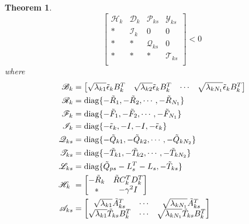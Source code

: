 \documentclass[conference]{IEEEtran}
\newtheorem{theorem}{Theorem}
\begin{document}
\begin{theorem}
	\begin{equation}\label{T3C3}
		\begin{bmatrix}
			\mathscr{H}_{k}&\mathscr{D}_{k}&\mathscr{P}_{ks}&\mathscr{Y}_{ks}\\
			*&\mathscr{I}_{k}&0&0\\
			*&*&\mathscr{Q}_{ks}&0\\
			*&*&*&\mathscr{T}_{ks}\\
		\end{bmatrix} <0
	\end{equation}
	where 
	\begin{equation}\notag
		\begin{split}
			\mathscr{B}_{k}&= \begin{bmatrix}
				\sqrt{\lambda_{k1}}\tilde{\epsilon}_{k}B^{T}_{k}&\sqrt{\lambda_{k2}}\tilde{\epsilon}_{k}B^{T}_{k}&\cdots&\sqrt{\lambda_{kN_{1}}}\tilde{\epsilon}_{k}B^{T}_{k}
			\end{bmatrix}\\
			\mathscr{R}_{k}&= \mathrm{diag}\{-\tilde{R}_{1}, -\tilde{R}_{2}, \cdots, -\tilde{R}_{N_{1}} \} \\
			\mathscr{F}_{k}&= \mathrm{diag}\{-\tilde{F}_{1}, -\tilde{F}_{2}, \cdots, -\tilde{F}_{N_{1}} \} \\	
			\mathscr{I}_{k} &= \mathrm{diag}\{-\tilde{\epsilon}_{k}, -I, -I, -\tilde{\epsilon}_{k} \}\\	
			\mathscr{Q}_{ks}&= \mathrm{diag}\{-\tilde{Q}_{k1}, -\tilde{Q}_{k2}, \cdots, -\tilde{Q}_{kN_{2}} \}\\
			\mathscr{T}_{ks}&= \mathrm{diag}\{-\tilde{T}_{k1}, -\tilde{T}_{k2}, \cdots, -\tilde{T}_{kN_{2}} \}\\
			\mathscr{L}_{ks}&= \mathrm{diag}\{\tilde{Q}_{ps}-L^{T}_{s}-L_{s},  -\tilde{T}_{ks} \}\\
			\mathscr{H}_{k}\ &= \begin{bmatrix}
				-\tilde{R}_{k} & \tilde{R}C^{T}_{k}D^{T}_{k}\\
				*& -\gamma^{2}I
			\end{bmatrix} \\
			\mathscr{A}_{ks} &=\begin{bmatrix}
				\sqrt{\lambda_{k1}} \tilde{A}^{T}_{ks}& \cdots&\sqrt{\lambda_{kN_{1}}} \tilde{A}^{T}_{ks}\\
				\sqrt{\lambda_{k1}}\tilde{T}_{ks}B^{T}_{k} &\cdots&\sqrt{\lambda_{kN_{1}}} \tilde{T}_{ks}B^{T}_{k}\\

\end{bmatrix}
\end{split}
\end{equation}
\end{theorem}
\end{document}
